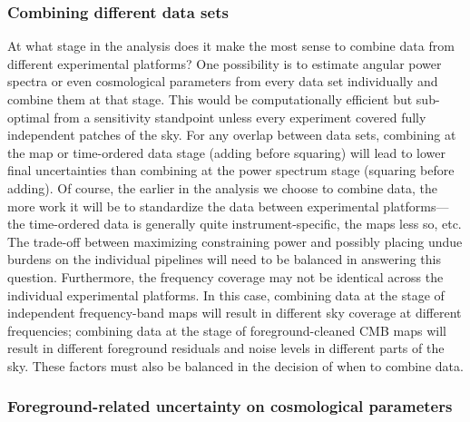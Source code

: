 \subsubsection{Combining different data sets}
\label{se:combine}
At what stage in the analysis does it make the most sense to combine data from different experimental platforms? 
One possibility is to estimate
angular power spectra or even cosmological parameters from every data set individually and combine them at that stage. This would
be computationally efficient but sub-optimal from a sensitivity standpoint unless every experiment
covered fully independent patches of the sky. For any overlap between data sets, combining at
the map or time-ordered data stage (adding before squaring) will lead to lower final uncertainties
than combining at the power spectrum stage (squaring before adding). Of course, the earlier in the analysis
we choose to combine data, the more work it will be to standardize the data between experimental platforms---the
time-ordered data is generally quite instrument-specific, the maps less so, etc. The trade-off between
maximizing constraining power and possibly placing undue burdens on the individual  
pipelines will need to be balanced in answering this question.
Furthermore, the frequency coverage may not be identical across the individual experimental platforms.
In this case, combining data at the stage of independent frequency-band maps will result in
different sky coverage at different frequencies; combining data at the stage of foreground-cleaned
CMB maps will result in different foreground residuals and noise levels in different parts of the sky.
These factors must also be balanced in the decision of when to combine data.

\subsubsection{Foreground-related uncertainty on cosmological parameters}
\label{se:paramforeg}


